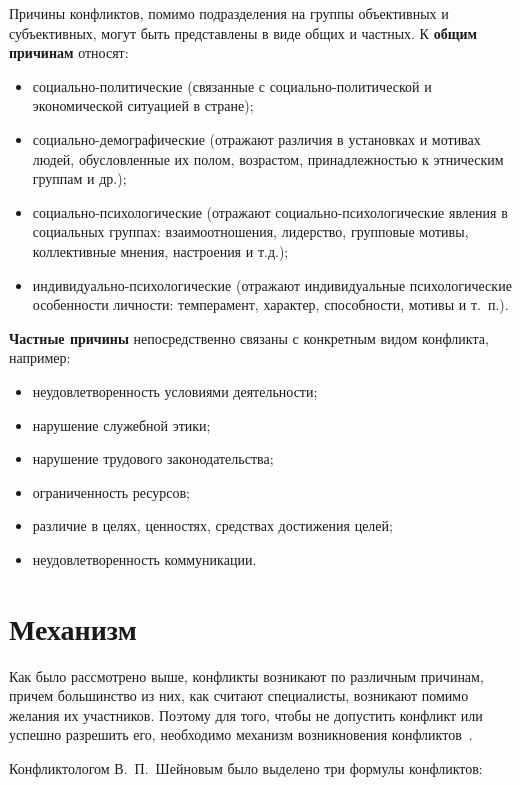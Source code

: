 Причины конфликтов, помимо подразделения на группы объективных и субъективных,
могут быть представлены в виде общих и частных. К \textbf{общим причинам} относят:
\begin{itemize}
    \item социально-политические (связанные с социально-политической и
        экономической ситуацией в стране);
    \item социально-демографические (отражают различия в установках и мотивах
        людей, обусловленные их полом, возрастом, принадлежностью к этническим
        группам и др.);
    \item социально-психологические (отражают социально-психологические явления
        в социальных группах: взаимоотношения, лидерство, групповые мотивы,
        коллективные мнения, настроения и т.д.);
    \item индивидуально-психологические (отражают индивидуальные
        психологические особенности личности: темперамент, характер,
        способности, мотивы и т.~п.).
\end{itemize}

\textbf{Частные причины} непосредственно связаны с конкретным видом конфликта,
например:
\begin{itemize}
    \item неудовлетворенность условиями деятельности;
    \item нарушение служебной этики;
    \item нарушение трудового законодательства;
    \item ограниченность ресурсов;
    \item различие в целях, ценностях, средствах достижения целей;
    \item неудовлетворенность коммуникации.
\end{itemize}

\section{Механизм}

Как было рассмотрено выше, конфликты возникают по различным причинам,
причем большинство из них, как считают специалисты, возникают помимо желания
их участников. Поэтому для того, чтобы не допустить конфликт или успешно
разрешить его, необходимо механизм возникновения конфликтов~\cite{art02}.

Конфликтологом В.~П.~Шейновым было выделено три формулы
конфликтов:

